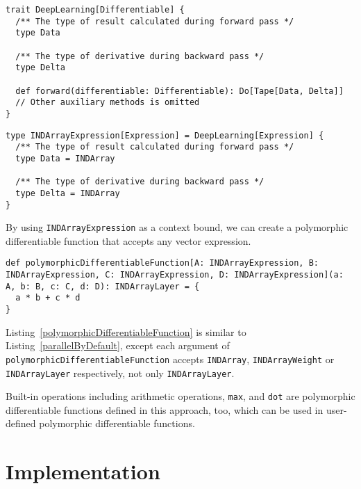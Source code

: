 \begin{lstlisting}[float={h t b p},caption={The dependent-type type \lstinline{DeepLearning}}, label={DeepLearning}]
trait DeepLearning[Differentiable] {
  /** The type of result calculated during forward pass */
  type Data

  /** The type of derivative during backward pass */
  type Delta

  def forward(differentiable: Differentiable): Do[Tape[Data, Delta]]
  // Other auxiliary methods is omitted
}
\end{lstlisting}

\begin{lstlisting}[float={h t b p},caption={A type class alias that witnesses dense vector expressions}, label={INDArrayDeepLearning}]
type INDArrayExpression[Expression] = DeepLearning[Expression] {
  /** The type of result calculated during forward pass */
  type Data = INDArray

  /** The type of derivative during backward pass */
  type Delta = INDArray
}
\end{lstlisting}

By using \lstinline{INDArrayExpression} as a context bound, we can create a polymorphic differentiable function that accepts any vector expression.

\begin{lstlisting}[float={h t b p},caption={A polymorphic differentiable function}, label={polymorphicDifferentiableFunction}]
def polymorphicDifferentiableFunction[A: INDArrayExpression, B: INDArrayExpression, C: INDArrayExpression, D: INDArrayExpression](a: A, b: B, c: C, d: D): INDArrayLayer = {
  a * b + c * d
}
\end{lstlisting}

Listing~\ref{polymorphicDifferentiableFunction} is similar to Listing~\ref{parallelByDefault}, except each argument of \lstinline{polymorphicDifferentiableFunction} accepts \lstinline{INDArray}, \lstinline{INDArrayWeight} or \lstinline{INDArrayLayer} respectively, not only  \lstinline{INDArrayLayer}.

Built-in operations including arithmetic operations, \lstinline{max}, and \lstinline{dot} are polymorphic differentiable functions defined in this approach, too, which can be used in user-defined polymorphic \glspl{differentiable function}.

\section{Implementation}
\label{implementation}


